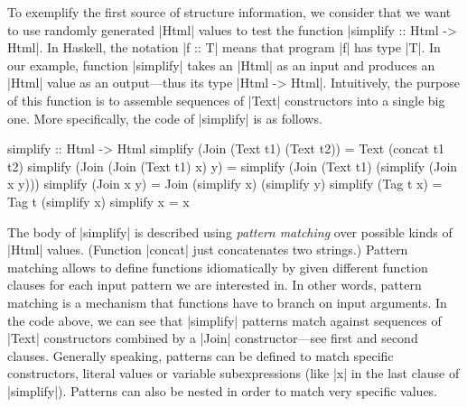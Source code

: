 To exemplify the first source of structure information, we consider that we want
to use randomly generated |Html| values to test the function |simplify :: Html
-> Html|.
%
In Haskell, the notation |f :: T| means that program |f| has type |T|.
%
In our example, function |simplify| takes an |Html| as an input and produces an
|Html| value as an output---thus its type |Html -> Html|.
%
Intuitively, the purpose of this function is to assemble sequences of |Text|
constructors into a single big one.
%
More specifically, the code of |simplify| is as follows.
%
\begin{code}
simplify :: Html -> Html
simplify (Join (Text t1) (Text t2))
  = Text (concat t1 t2)
simplify (Join (Join (Text t1) x) y)
  = simplify (Join (Text t1) (simplify (Join x y)))
simplify (Join x y) = Join (simplify x) (simplify y)
simplify (Tag t x) = Tag t (simplify x)
simplify x = x
\end{code}
%
The body of |simplify| is described using \emph{pattern matching} over possible
kinds of |Html| values. (Function |concat| just concatenates two strings.)
%
Pattern matching allows to define functions idiomatically by given different
function clauses for each input pattern we are interested in.
%
In other words, pattern matching is a mechanism that functions have to branch on
input arguments.
%
In the code above, we can see that |simplify| patterns match against sequences
of |Text| constructors combined by a |Join| constructor---see first and second
clauses.
%
Generally speaking, patterns can be defined to match specific constructors,
literal values or variable subexpressions (like |x| in the last clause of
|simplify|).
%
Patterns can also be nested in order to match very specific values.



